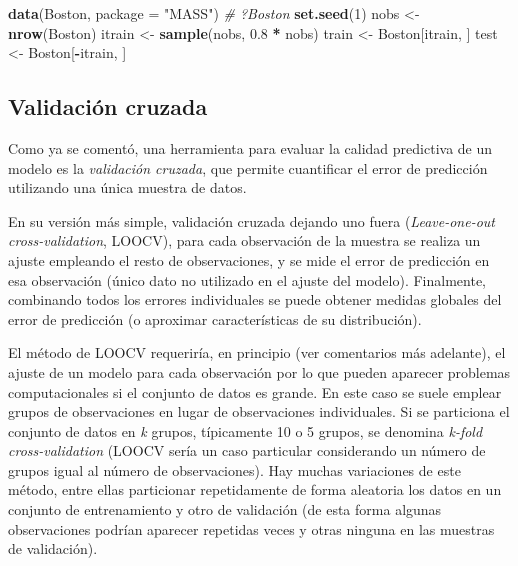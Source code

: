 \documentclass[]{book}
\newenvironment{Shaded}{\begin{snugshade}}{\end{snugshade}}
\newcommand{\KeywordTok}[1]{\textcolor[rgb]{0.13,0.29,0.53}{\textbf{#1}}}
\newcommand{\DataTypeTok}[1]{\textcolor[rgb]{0.13,0.29,0.53}{#1}}
\newcommand{\DecValTok}[1]{\textcolor[rgb]{0.00,0.00,0.81}{#1}}
\newcommand{\FloatTok}[1]{\textcolor[rgb]{0.00,0.00,0.81}{#1}}
\newcommand{\StringTok}[1]{\textcolor[rgb]{0.31,0.60,0.02}{#1}}
\newcommand{\CommentTok}[1]{\textcolor[rgb]{0.56,0.35,0.01}{\textit{#1}}}
\newcommand{\OperatorTok}[1]{\textcolor[rgb]{0.81,0.36,0.00}{\textbf{#1}}}
\newcommand{\NormalTok}[1]{#1}
\theoremstyle{break}
\theoremstyle{definition}
\theoremstyle{definition}
\theoremstyle{definition}
\theoremstyle{remark}
\begin{document}
\begin{Shaded}
\begin{Highlighting}[]
\KeywordTok{data}\NormalTok{(Boston, }\DataTypeTok{package =} \StringTok{"MASS"}\NormalTok{)}
\CommentTok{# ?Boston}
\KeywordTok{set.seed}\NormalTok{(}\DecValTok{1}\NormalTok{)}
\NormalTok{nobs <-}\StringTok{ }\KeywordTok{nrow}\NormalTok{(Boston)}
\NormalTok{itrain <-}\StringTok{ }\KeywordTok{sample}\NormalTok{(nobs, }\FloatTok{0.8} \OperatorTok{*}\StringTok{ }\NormalTok{nobs)}
\NormalTok{train <-}\StringTok{ }\NormalTok{Boston[itrain, ]}
\NormalTok{test <-}\StringTok{ }\NormalTok{Boston[}\OperatorTok{-}\NormalTok{itrain, ]}
\end{Highlighting}
\end{Shaded}

\subsection{Validación cruzada}\label{cv}

Como ya se comentó, una herramienta para evaluar la calidad predictiva
de un modelo es la \emph{validación cruzada}, que permite cuantificar el
error de predicción utilizando una única muestra de datos.

En su versión más simple, validación cruzada dejando uno fuera
(\emph{Leave-one-out cross-validation}, LOOCV), para cada observación de
la muestra se realiza un ajuste empleando el resto de observaciones, y
se mide el error de predicción en esa observación (único dato no
utilizado en el ajuste del modelo). Finalmente, combinando todos los
errores individuales se puede obtener medidas globales del error de
predicción (o aproximar características de su distribución).

El método de LOOCV requeriría, en principio (ver comentarios más
adelante), el ajuste de un modelo para cada observación por lo que
pueden aparecer problemas computacionales si el conjunto de datos es
grande. En este caso se suele emplear grupos de observaciones en lugar
de observaciones individuales. Si se particiona el conjunto de datos en
\emph{k} grupos, típicamente 10 o 5 grupos, se denomina \emph{k-fold
cross-validation} (LOOCV sería un caso particular considerando un número
de grupos igual al número de observaciones). Hay muchas variaciones de
este método, entre ellas particionar repetidamente de forma aleatoria
los datos en un conjunto de entrenamiento y otro de validación (de esta
forma algunas observaciones podrían aparecer repetidas veces y otras
ninguna en las muestras de validación).
\end{document}
